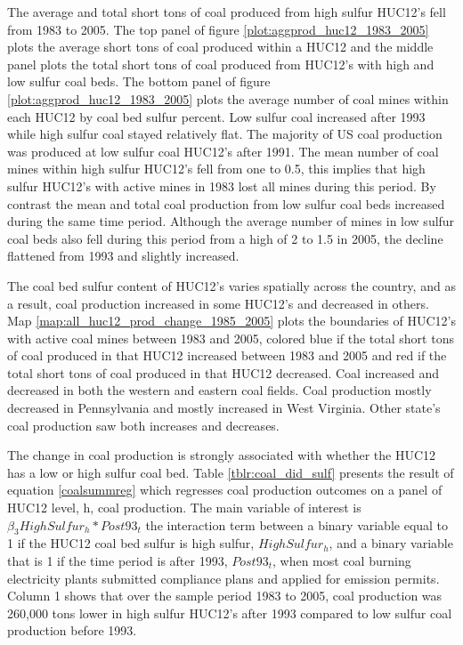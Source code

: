 \documentclass{article}
\begin{document}
The average and total short tons of coal produced from high sulfur HUC12's fell from 1983 to 2005. The top panel of figure \ref{plot:aggprod_huc12_1983_2005} plots the average short tons of coal produced within a HUC12 and the middle panel plots the total short tons of coal produced from HUC12's with high and low sulfur coal beds. The bottom panel of figure \ref{plot:aggprod_huc12_1983_2005} plots the average number of coal mines within each HUC12 by coal bed sulfur percent. Low sulfur coal increased after 1993 while high sulfur coal stayed relatively flat. The majority of US coal production was produced at low sulfur coal HUC12's after 1991. The mean number of coal mines within high sulfur HUC12's fell from one to 0.5, this implies that high sulfur HUC12's with active mines in 1983 lost all mines during this period. By contrast the mean and total coal production from low sulfur coal beds increased during the same time period. Although the average number of mines in low sulfur coal beds also fell during this period from a high of 2 to 1.5 in 2005, the decline flattened from 1993 and slightly increased.

The coal bed sulfur content of HUC12's varies spatially across the country, and as a result, coal production increased in some HUC12's and decreased in others. Map \ref{map:all_huc12_prod_change_1985_2005} plots the boundaries of HUC12's with active coal mines between 1983 and 2005, colored blue if the total short tons of coal produced in that HUC12 increased between 1983 and 2005 and red if the total short tons of coal produced in that HUC12 decreased. Coal increased and decreased in both the western and eastern coal fields. Coal production mostly decreased in Pennsylvania and mostly increased in West Virginia. Other state's coal production saw both increases and decreases.

The change in coal production is strongly associated with whether the HUC12 has a low or high sulfur coal bed. Table \ref{tblr:coal_did_sulf} presents the result of equation \ref{coalsummreg} which regresses coal production outcomes on a panel of HUC12 level, h, coal production. The main variable of interest is $\beta_3HighSulfur_h*Post93_t$ the interaction term between a binary variable equal to 1 if the HUC12 coal bed sulfur is high sulfur, $HighSulfur_h$, and a binary variable that is 1 if the time period is after 1993, $Post93_t$, when most coal burning electricity plants submitted compliance plans and applied for emission permits. Column 1 shows that over the sample period 1983 to 2005, coal production was 260,000 tons lower in high sulfur HUC12's after 1993 compared to low sulfur coal production before 1993.
\end{document}
